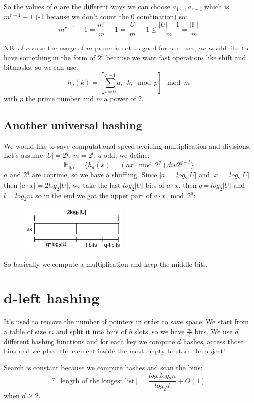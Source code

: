 So the values of $a$ are the different ways we can choose $a_1, \_, a_{r-1}$ which is $m^{r-1} -1$ (-1 because we don't count the 0 combination) so:
$$
    m^{r-1} -1 = \frac{m^r}{m} - 1 = \frac{|U|}{m} - 1 \leq \frac{|U| - 1}{m} = \frac{|\mathbb{H}|}{m}
$$

NB: of course the usage of $m$ prime is not so good for our uses, we would like to have something in the form of $2^x$ because we want fast operations like shift and bitmasks, so we can use:
$$
    h_a(k) = \left[ \sum_{i=0}^{r-1} a_i \cdot k_i \mod p \right] \mod m
$$
with $p$ the prime number and $m$ a power of 2.

\subsection{Another universal hashing}
We would like to save computational speed avoiding multiplication and divisions.
Let's assume $|U| = 2^q$, $m = 2^l$, $a$ odd, we define:
$$
    \mathbb{H}_{q,l} = \{ h_a(x) = (a x \mod 2^q) div 2^{q-l} \}
$$
$a$ and $2^q$ are coprime, so we have a shuffling.
Since $|a| = log_2 |U|$ and $|x|=log_2 |U|$ then $|a \cdot x| = 2 log_2 |U|$, we take the last $log_2 |U|$ bits of $a \cdot x$, then $q = log_2 |U|$ and $l = log_2 m$ so in the end we got the upper part of $a \cdot x \mod 2^q$:
\begin{figure}[H]
    \centering
    \includegraphics[width=200px]{images/7_Hashing/another_universal_hash.png}
\end{figure}
So basically we compute a multiplication and keep the middle bits.

\section{d-left hashing}
It's used to remove the number of pointers in order to save space.
We start from a table of size $m$ and split it into bins of $b$ slots, so we have $\frac{m}{b}$ bins.
We use $d$ different hashing functions and for each key we compute $d$ hashes, access those bins and we place the element inside the most empty to store the object!

Search is constant because we compute hashes and scan the bins:
$$
    \mathbb{E}[\text{length of the longest list}] = \frac{log_2 log_2 n}{log_2 d} + O(1)
$$
when $d \geq 2$.

